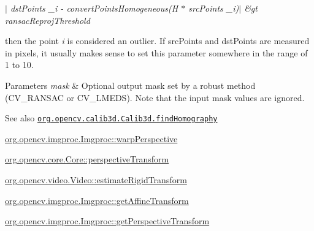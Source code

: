 {\itshape $\vert$ dst\+Points \+\_\+i -\/ convert\+Points\+Homogeneous(\+H $\ast$ src\+Points \+\_\+i)$\vert$ \&gt ransac\+Reproj\+Threshold}

then the point {\itshape i} is considered an outlier. If {\ttfamily src\+Points} and {\ttfamily dst\+Points} are measured in pixels, it usually makes sense to set this parameter somewhere in the range of 1 to 10.


\begin{DoxyParams}{Parameters}
{\em mask} & Optional output mask set by a robust method ({\ttfamily C\+V\+\_\+\+R\+A\+N\+S\+AC} or {\ttfamily C\+V\+\_\+\+L\+M\+E\+DS}). Note that the input mask values are ignored.\\
\hline
\end{DoxyParams}
\begin{DoxySeeAlso}{See also}
\href{http://docs.opencv.org/modules/calib3d/doc/camera_calibration_and_3d_reconstruction.html#findhomography}{\tt org.\+opencv.\+calib3d.\+Calib3d.\+find\+Homography} 

\mbox{\hyperlink{classorg_1_1opencv_1_1imgproc_1_1_imgproc_aad167fa9fe0009a54f7732488102938c}{org.\+opencv.\+imgproc.\+Imgproc\+::warp\+Perspective}} 

\mbox{\hyperlink{classorg_1_1opencv_1_1core_1_1_core_a1ff0eace0f00e79af5228fdae120342a}{org.\+opencv.\+core.\+Core\+::perspective\+Transform}} 

\mbox{\hyperlink{classorg_1_1opencv_1_1video_1_1_video_ad9c2fbb377a485b9619be2c78eaf7cee}{org.\+opencv.\+video.\+Video\+::estimate\+Rigid\+Transform}} 

\mbox{\hyperlink{classorg_1_1opencv_1_1imgproc_1_1_imgproc_a283e61c00d4e6ba9625264d8d7f5f8db}{org.\+opencv.\+imgproc.\+Imgproc\+::get\+Affine\+Transform}} 

\mbox{\hyperlink{classorg_1_1opencv_1_1imgproc_1_1_imgproc_ab3727363e269af640d5254f76e14ddb6}{org.\+opencv.\+imgproc.\+Imgproc\+::get\+Perspective\+Transform}} 
\end{DoxySeeAlso}
\mbox{\label{classorg_1_1opencv_1_1calib3d_1_1_calib3d_ad95dde1b1f976545692c0fc8b11d2c22}} 
